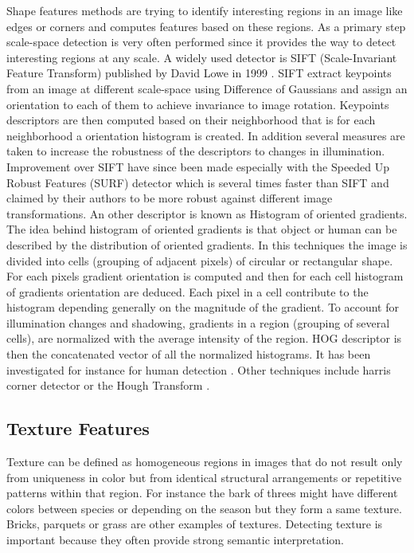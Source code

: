   Shape features methods are trying to identify interesting regions in an image like edges or corners and computes features based on these regions. As a primary step scale-space detection is very often performed since it provides the way to detect interesting regions at any scale. A widely used detector is SIFT (Scale-Invariant Feature Transform) published by David Lowe in 1999 \cite{lowe2004distinctive}. SIFT extract keypoints from an image at different scale-space using Difference of Gaussians and assign an orientation to each of them to achieve invariance to image rotation. Keypoints descriptors are then computed based on their neighborhood that is for each neighborhood a orientation histogram is created. In addition several measures are taken to increase the robustness of the descriptors to changes in illumination. Improvement over SIFT have since been made especially with the Speeded Up Robust Features (SURF) detector \cite{bay2006surf} which is several times faster than SIFT and claimed by their authors to be more robust against different image transformations.
  An other descriptor is known as Histogram of oriented gradients. The idea behind histogram of oriented gradients is that object or human can be described by the distribution of oriented gradients. In this techniques the image is divided into cells (grouping of adjacent pixels) of circular or rectangular shape. For each pixels gradient orientation is computed and then for each cell histogram of gradients orientation are deduced. Each pixel in a cell contribute to the histogram depending generally on the magnitude of the gradient. To account for illumination changes and shadowing, gradients in a region (grouping of several cells), are normalized with the average intensity of the region. HOG descriptor is then the concatenated vector of all the normalized histograms. It has been investigated for instance for human detection \cite{dalal2005histograms}.
  Other techniques include harris corner detector \cite{harris1988combined} or the Hough Transform \cite{ballard1981generalizing}.

  \subsection{Texture Features}

   Texture can be defined as homogeneous regions in images that do not result only from uniqueness in color but from identical structural arrangements or repetitive patterns within that region. For instance the bark of threes might have different colors between species or depending on the season but they form a same texture. Bricks, parquets or grass are other examples of textures. Detecting texture is important because they often provide strong semantic interpretation.

